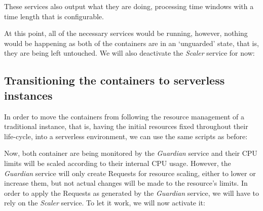 \documentclass[12pt]{article}
\begin{document}
These services also output what they are doing, processing time windows with a time length that is configurable.

At this point, all of the necessary services would be running, however, nothing would be happening as both of the containers are in an `unguarded' state, that is, they are being left untouched. We will also deactivate the \textit{Scaler} service for now: \newline

\noindent {} \newline {}


\subsection{Transitioning the containers to serverless instances}

In order to move the containers from following the resource management of a traditional instance, that is, having the initial resources fixed throughout their life-cycle, into a serverless environment, we can use the same scripts as before: \newline

\noindent {} \newline
{} \newline

Now, both container are being monitored by the \textit{Guardian} service and their CPU limits will be scaled according to their internal CPU usage. However, the \textit{Guardian} service will only create Requests for resource scaling, either to lower or increase them, but not actual changes will be made to the resource's limits. In order to apply the Requests as generated by the \textit{Guardian} service, we will have to rely on the \textit{Scaler} service. To let it work, we will now activate it: \newline

\noindent {} \newline {} \newline
\end{document}
